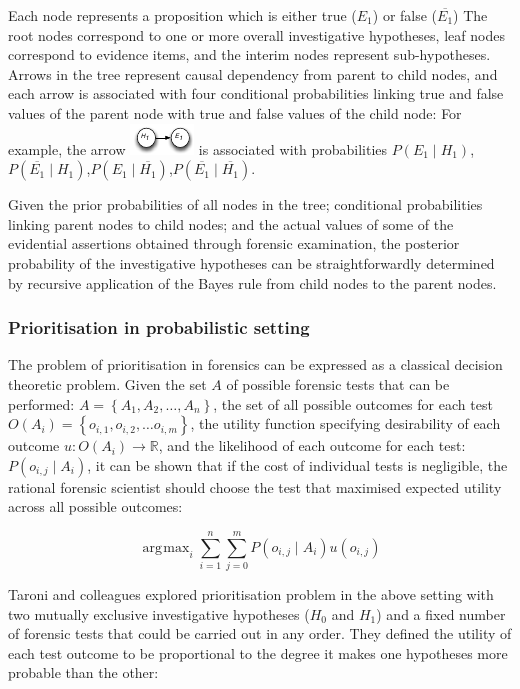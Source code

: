 \documentclass[10pt,a4paper]{article}
\DeclareMathOperator*{\argmax}{\arg\!\max}
\begin{document}
Each node represents a proposition which is either true ($E_1$) or false ($\overline{E_1}$) The root nodes correspond to one or more overall investigative hypotheses, leaf nodes correspond to evidence items, and the interim nodes represent sub-hypotheses. Arrows in the tree represent causal dependency from parent to child nodes, and each arrow is associated with four conditional probabilities linking true and false values of the parent node with true and false values of the child node: For example, the arrow \includegraphics{insert.pdf} is associated with probabilities $P(E_1 \mid H_1)$,$P(\overline{E_1} \mid H_1)$,$P(E_1 \mid \overline{H_1})$,$P(\overline{E_1} \mid \overline{H_1})$. 

Given the prior probabilities of all nodes in the tree; conditional probabilities linking parent nodes to child nodes; and the actual values of some of the evidential assertions obtained through forensic examination, the posterior probability of the investigative hypotheses can be straightforwardly determined by recursive application of the Bayes rule from child nodes to the parent nodes.

\subsubsection{Prioritisation in probabilistic setting}

The problem of prioritisation in forensics can be expressed as a classical decision theoretic problem. Given the set $A$ of possible forensic tests that can be performed: $A=\left\{A_1,A_2,\dots,A_n\right\}$, the set of all possible outcomes for each test $O(A_i)=\left\{o_{i,1},o_{i,2},\dots o_{i,m} \right\}$, the utility function specifying desirability of each outcome $ u \colon O(A_i) \rightarrow \mathbb{R} $, and the likelihood of each outcome for each test: $P(o_{i,j} \mid A_i)$, it can be shown that if the cost of individual tests is negligible, the rational forensic scientist should choose the test that maximised expected utility across all possible outcomes:

\begin{equation}
\argmax_{i}\sum_{i=1}^{n}\sum_{j=0}^m P(o_{i,j}\mid A_i )u(o_{i,j} )
\end{equation}

Taroni and colleagues \cite{taroni2010data} explored prioritisation problem in the above setting with two mutually exclusive investigative hypotheses ($H_0$ and $H_1$) and a fixed number of forensic tests that could be carried out in any order.  They defined the utility of each test outcome to be proportional to the degree it makes one hypotheses more probable than the other:
\end{document}
